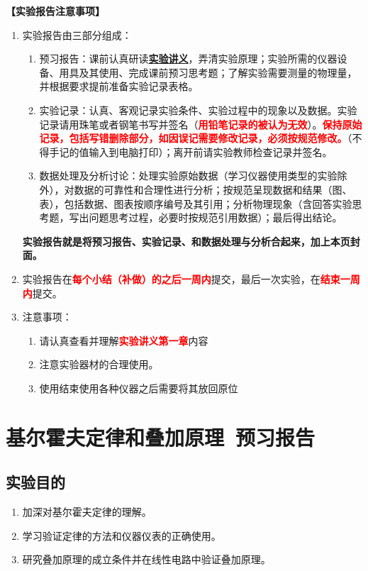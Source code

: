 \documentclass[dvipsnames, svgnames,a4paper,11pt]{article}
\newcommand{\exname}{基尔霍夫定律和叠加原理}%
\begin{document}
\textbf{【实验报告注意事项】}
\begin{enumerate}
	\item 实验报告由三部分组成：
	\begin{enumerate}
		\item 预习报告：课前认真研读\underline{\textbf{实验讲义}}，弄清实验原理；实验所需的仪器设备、用具及其使用、完成课前预习思考题；了解实验需要测量的物理量，并根据要求提前准备实验记录表格。
	    \item 实验记录：认真、客观记录实验条件、实验过程中的现象以及数据。实验记录请用珠笔或者钢笔书写并签名（\textcolor{red}{\textbf{用铅笔记录的被认为无效}}）。\textcolor{red}{\textbf{保持原始记录，包括写错删除部分，如因误记需要修改记录，必须按规范修改。}}（不得手记的值输入到电脑打印）；离开前请实验教师检查记录并签名。
	    \item 数据处理及分析讨论：处理实验原始数据（学习仪器使用类型的实验除外），对数据的可靠性和合理性进行分析；按规范呈现数据和结果（图、表），包括数据、图表按顺序编号及其引用；分析物理现象（含回答实验思考题，写出问题思考过程，必要时按规范引用数据）；最后得出结论。
	\end{enumerate}
	\textbf{实验报告就是将预习报告、实验记录、和数据处理与分析合起来，加上本页封面。}
	\item 实验报告在\textcolor{red}{\textbf{每个小结（补做）的之后一周内}}提交，最后一次实验，在\textcolor{red}{\textbf{结束一周内}}提交。
	\item 注意事项：\begin{enumerate}
		\item 请认真查看并理解\textcolor{red}{\textbf{实验讲义第一章}}内容
		\item 注意实验器材的合理使用。
		\item 使用结束使用各种仪器之后需要将其放回原位
	\end{enumerate}
\end{enumerate}



\clearpage
\tableofcontents
\clearpage

\setcounter{section}{0}
\section{\exname\ \textbf{预习报告}}
	
\subsection{实验目的}
\begin{enumerate}
    \item 加深对基尔霍夫定律的理解。
    \item 学习验证定律的方法和仪器仪表的正确使用。
    \item 研究叠加原理的成立条件并在线性电路中验证叠加原理。
\end{enumerate}
\end{document}
